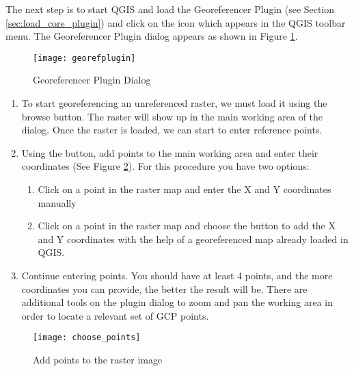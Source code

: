 The next step is to start QGIS and load the Georeferencer Plugin (see Section 
  \ref{sec:load_core_plugin}) and click on the  
  icon which appears in the QGIS toolbar menu. The Georeferencer Plugin dialog appears as 
  shown in Figure \ref{fig:georefplugin}.

\begin{figure}[ht]
\begin{center}
  \caption{Georeferencer Plugin Dialog \nixcaption}\label{fig:georefplugin}\smallskip
  \texttt{[image: georefplugin]}
\end{center}
\end{figure}

\label{georeferencer_entering}

\begin{enumerate}
\item To start georeferencing an unreferenced raster, we must load it using the \browsebutton browse button. The raster will show up in the main working area of the dialog. Once the raster is loaded, we can start to enter reference points.

\item Using the  button, add points to the main working area and enter their coordinates (See Figure \ref{fig:choose_points}). For this procedure you have two options:

\begin{enumerate}
\item Click on a point in the raster map and enter the X and Y coordinates manually
\item Click on a point in the raster map and choose the button  to add the X and Y coordinates with the help of a georeferenced map already loaded in QGIS.
\end{enumerate}
\item Continue entering points. You should have at least 4 points, and the more coordinates you can provide, the better the result will be. There are additional tools on the plugin dialog to zoom and pan the working area in order to locate a relevant set of GCP points.
\end{enumerate}

\begin{figure}[ht]
\begin{center}
  \caption{Add points to the raster image \nixcaption}\label{fig:choose_points}\smallskip
  \texttt{[image: choose\_points]}
\end{center}
\end{figure}

